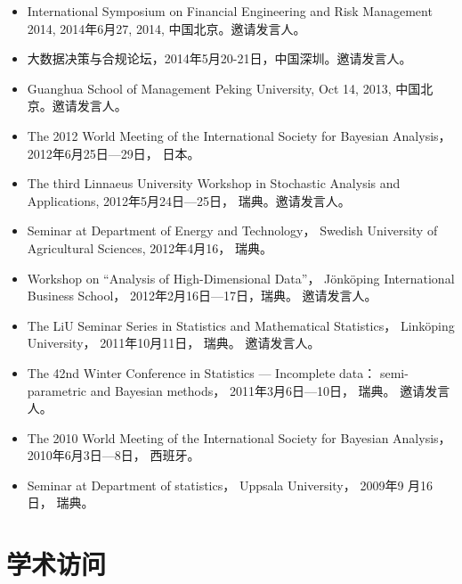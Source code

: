 \documentclass[twoside,a4paper,11pt]{article}
\begin{document}
\begin{itemize}
\item International Symposium on Financial Engineering and Risk Management 2014, 2014年6月27,
  2014, 中国北京。邀请发言人。

\item 大数据决策与合规论坛，2014年5月20-21日，中国深圳。邀请发言人。

\item Guanghua School of Management Peking University, Oct 14, 2013, 中国北京。邀请发言人。

\item The 2012 World Meeting of the International Society for Bayesian
  Analysis， 2012年6月25日---29日， 日本。

\item The third Linnaeus University Workshop in Stochastic Analysis and
  Applications, 2012年5月24日---25日， 瑞典。邀请发言人。

\item Seminar at Department of Energy and Technology， Swedish
  University of Agricultural Sciences, 2012年4月16， 瑞典。

\item Workshop on ``Analysis of High-Dimensional Data''，
  Jönköping International Business School， 2012年2月16日---17日，瑞典。
  邀请发言人。

\item The LiU Seminar Series in Statistics and Mathematical Statistics，
  Linköping University， 2011年10月11日， 瑞典。 邀请发言人。

\item The 42nd Winter Conference in Statistics --- Incomplete data：
  semi-parametric and Bayesian methods， 2011年3月6日---10日，
  瑞典。 邀请发言人。

\item The 2010 World Meeting of the International Society for Bayesian
  Analysis， 2010年6月3日---8日， 西班牙。

\item Seminar at Department of statistics， Uppsala University， 2009年9
  月16日， 瑞典。

\end{itemize}


\section*{学术访问}
\end{document}
